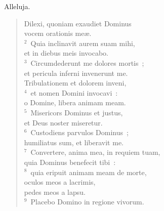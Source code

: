 \bchapter
\lettrine[lines=3,image=true,loversize=0.05,lraise=-0.03]{A}{}lleluja. \begin{flushleft}\begin{verse}\vspace{6pt}Dilexi, quoniam exaudiet Dominus\\ vocem orationis me\ae .\\
${}^{2}$~Quia inclinavit aurem suam mihi,\\ et in diebus meis invocabo.\\
${}^{3}$~Circumdederunt me dolores mortis~;\\ et pericula inferni invenerunt me.\\ Tribulationem et dolorem inveni,\\
${}^{4}$~et nomen Domini invocavi~:\\ o Domine, libera animam meam.\\
${}^{5}$~Misericors Dominus et justus,\\ et Deus noster miseretur.\\
${}^{6}$~Custodiens parvulos Dominus~;\\ humiliatus sum, et liberavit me.\\
${}^{7}$~Convertere, anima mea, in requiem tuam,\\ quia Dominus benefecit tibi~:\\
${}^{8}$~quia eripuit animam meam de morte,\\ oculos meos a lacrimis,\\ pedes meos a lapsu.\\
${}^{9}$~Placebo Domino in regione vivorum.\end{verse}\end{flushleft}



